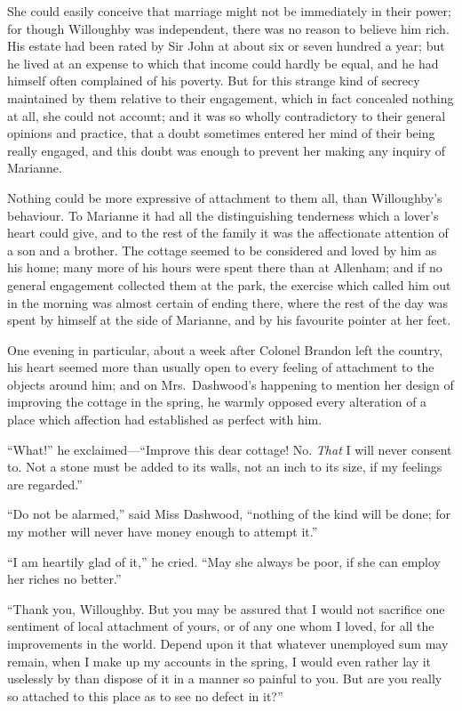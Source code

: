 She could easily conceive that marriage might not
be immediately in their power; for though Willoughby
was independent, there was no reason to believe him rich.
His estate had been rated by Sir John at about six or seven
hundred a year; but he lived at an expense to which that income
could hardly be equal, and he had himself often complained
of his poverty.  But for this strange kind of secrecy
maintained by them relative to their engagement, which
in fact concealed nothing at all, she could not account;
and it was so wholly contradictory to their general
opinions and practice, that a doubt sometimes entered
her mind of their being really engaged, and this doubt
was enough to prevent her making any inquiry of Marianne.

Nothing could be more expressive of attachment
to them all, than Willoughby's behaviour.  To Marianne
it had all the distinguishing tenderness which a lover's
heart could give, and to the rest of the family it was the
affectionate attention of a son and a brother.  The cottage
seemed to be considered and loved by him as his home;
many more of his hours were spent there than at Allenham;
and if no general engagement collected them at the park,
the exercise which called him out in the morning was
almost certain of ending there, where the rest of the day
was spent by himself at the side of Marianne, and by his
favourite pointer at her feet.

One evening in particular, about a week after
Colonel Brandon left the country, his heart seemed
more than usually open to every feeling of attachment
to the objects around him; and on Mrs.\ Dashwood's
happening to mention her design of improving the cottage
in the spring, he warmly opposed every alteration
of a place which affection had established as perfect with him.

``What!'' he exclaimed---``Improve this dear cottage!
No. \emph{That} I will never consent to.  Not a stone must
be added to its walls, not an inch to its size,
if my feelings are regarded.''

``Do not be alarmed,'' said Miss Dashwood,
``nothing of the kind will be done; for my mother
will never have money enough to attempt it.''

``I am heartily glad of it,'' he cried.  ``May she
always be poor, if she can employ her riches no better.''

``Thank you, Willoughby.  But you may be assured that I
would not sacrifice one sentiment of local attachment
of yours, or of any one whom I loved, for all the improvements
in the world.  Depend upon it that whatever unemployed
sum may remain, when I make up my accounts in the spring,
I would even rather lay it uselessly by than dispose
of it in a manner so painful to you.  But are you really
so attached to this place as to see no defect in it?''


